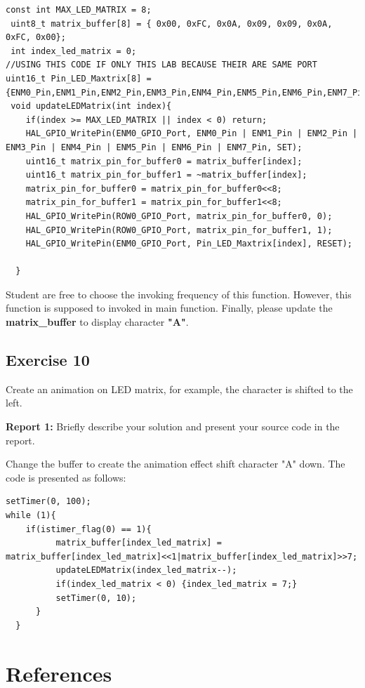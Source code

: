 \documentclass[twoside, final]{hcmut_report}
\begin{document}
\begin{lstlisting}[caption=Function to display data on LED Matrix]
 const int MAX_LED_MATRIX = 8;
 uint8_t matrix_buffer[8] = { 0x00, 0xFC, 0x0A, 0x09, 0x09, 0x0A, 0xFC, 0x00};
 int index_led_matrix = 0;
//USING THIS CODE IF ONLY THIS LAB BECAUSE THEIR ARE SAME PORT
uint16_t Pin_LED_Maxtrix[8] = {ENM0_Pin,ENM1_Pin,ENM2_Pin,ENM3_Pin,ENM4_Pin,ENM5_Pin,ENM6_Pin,ENM7_Pin};
 void updateLEDMatrix(int index){
	if(index >= MAX_LED_MATRIX || index < 0) return;
	HAL_GPIO_WritePin(ENM0_GPIO_Port, ENM0_Pin | ENM1_Pin | ENM2_Pin | ENM3_Pin | ENM4_Pin | ENM5_Pin | ENM6_Pin | ENM7_Pin, SET);
	uint16_t matrix_pin_for_buffer0 = matrix_buffer[index];
	uint16_t matrix_pin_for_buffer1 = ~matrix_buffer[index];
	matrix_pin_for_buffer0 = matrix_pin_for_buffer0<<8;
	matrix_pin_for_buffer1 = matrix_pin_for_buffer1<<8;
	HAL_GPIO_WritePin(ROW0_GPIO_Port, matrix_pin_for_buffer0, 0);
	HAL_GPIO_WritePin(ROW0_GPIO_Port, matrix_pin_for_buffer1, 1);
	HAL_GPIO_WritePin(ENM0_GPIO_Port, Pin_LED_Maxtrix[index], RESET);

  }
\end{lstlisting}

Student are free to choose the invoking frequency of this function. However, this function is supposed to invoked in main function. Finally, please update the \textbf{matrix\_buffer} to display character \textbf{"A"}.

\subsection{Exercise 10}
Create an animation on LED matrix, for example, the character is shifted to the left. 

\textbf{Report 1: } Briefly describe your solution and present your source code in the report.

Change the buffer to create the animation effect shift character "A" down. The code is presented as follows:
\begin{lstlisting}[caption= the while loop on main function]
	  setTimer(0, 100);
while (1){
	if(istimer_flag(0) == 1){
		  matrix_buffer[index_led_matrix] = matrix_buffer[index_led_matrix]<<1|matrix_buffer[index_led_matrix]>>7;
		  updateLEDMatrix(index_led_matrix--);
		  if(index_led_matrix < 0) {index_led_matrix = 7;}
		  setTimer(0, 10);
	  }
  }
\end{lstlisting}

\pagebreak
\section*{References}
\end{document}
